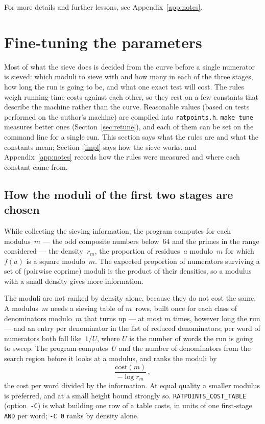 \documentclass[12pt,a4paper,oneside]{amsart}
\begin{document}
For more details and further lessons, see Appendix~\ref{app:notes}.


\section{Fine-tuning the parameters}\label{sec:tuning}

Most of what the sieve does is decided from the curve before a single
numerator is sieved: which moduli to sieve with and how many in each of the
three stages, how long the run is going to be, and what one exact test will
cost. The rules weigh running-time costs against each other, so they rest on
a few constants that describe the machine rather than the curve. Reasonable
values (based on tests performed on the author's machine)
are compiled into \texttt{ratpoints.h}. \texttt{make tune} measures
better ones (Section~\ref{sec:retune}), and each of them can be set on the
command line for a single run. This section says what the rules are and
what the constants mean; Section~\ref{impl} says how the sieve works, and
Appendix~\ref{app:notes} records how the rules were measured and where each
constant came from.

\subsection{How the moduli of the first two stages are chosen}\label{sec:spchoice}

While collecting the sieving information, the program computes for each
modulus~$m$ --- the odd composite numbers below~$64$ and the primes in the
range considered --- the
density~$r_m$, the proportion of residues~$a$ modulo~$m$ for which $f(a)$
is a square modulo~$m$. The expected proportion of numerators surviving a set of
(pairwise coprime)
moduli is the product of their densities, so a modulus with a small density
gives more information.

The moduli are not ranked by density alone, because they do not cost the
same. A modulus~$m$ needs a sieving table of $m$~rows, built once for each
class of denominators modulo~$m$ that turns up --- at most $m$ times, however
long the run --- and an entry per denominator in the list of reduced
denominators; per word of numerators both fall like~$1/U$, where $U$ is the
number of words the run is going to sweep. The program computes~$U$ and the
number of denominators from the search region before it looks at a modulus,
and ranks the moduli by
\[ \frac{\text{cost}(m)}{-\log r_m} \,, \]
the cost per word divided by the information. At equal quality a smaller
modulus is preferred, and at a small height bound strongly so.
\texttt{RATPOINTS\_COST\_TABLE} (option~\verb+-C+) is what building one
row of a table costs, in units of one first-stage \texttt{AND} per word;
\verb+-C 0+ ranks by density alone.
\end{document}
